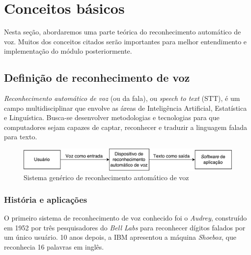 \chapter{Conceitos básicos}
\label{cap:structure-of-speech}

Nesta seção, abordaremos uma parte teórica do reconhecimento automático de voz. Muitos dos conceitos citados serão importantes para melhor entendimento e implementação do módulo posteriormente.


\section{Definição de reconhecimento de voz}


\textit{Reconhecimento automático de voz} (ou da fala), ou \textit{speech to text} (STT), é um campo multidisciplinar que envolve as áreas de Inteligência Artificial, Estatística e Linguística. Busca-se desenvolver metodologias e tecnologias para que computadores sejam capazes de captar, reconhecer e traduzir a linguagem falada para texto.

\begin{figure}[H]
  \centering
  \includegraphics[width=.7\textwidth]{image/speech_system.pdf}
  \caption{Sistema genérico de reconhecimento automático de voz}
  \label{speech_system}
\end{figure}


\subsection{História e aplicações}

O primeiro sistema de reconhecimento de voz conhecido foi o \textit{Audrey}, construído em 1952 por três pesquisadores do \textit{Bell Labs} para reconhecer dígitos falados por um único usuário. 10 anos depois, a IBM apresentou a máquina \textit{Shoebox}, que reconhecia 16 palavras em inglês.

